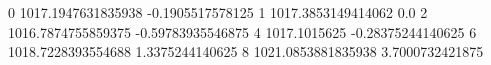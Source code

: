 0 1017.1947631835938 -0.1905517578125
1 1017.3853149414062 0.0
2 1016.7874755859375 -0.59783935546875
4 1017.1015625 -0.28375244140625
6 1018.7228393554688 1.3375244140625
8 1021.0853881835938 3.7000732421875
